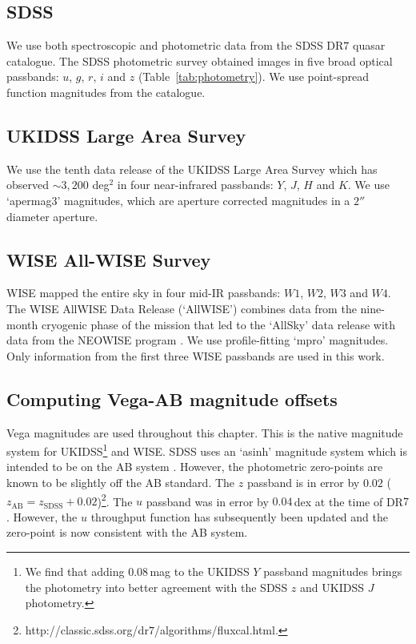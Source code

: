 \subsection{SDSS}

We use both spectroscopic and photometric data from the SDSS DR$7$ quasar catalogue.
The SDSS photometric survey obtained images in five broad optical passbands: $u$, $g$, $r$, $i$ and $z$ (Table~\ref{tab:photometry}).  
We use point-spread function magnitudes from the catalogue.

\subsection{UKIDSS Large Area Survey}

We use the tenth data release of the UKIDSS Large Area Survey which has observed $\sim 3,200$ deg$^2$ in four near-infrared passbands: $Y$, $J$, $H$ and $K$. 
We use `apermag$3$' magnitudes, which are aperture corrected magnitudes in a $2''$ diameter aperture.

\subsection{WISE All-WISE Survey}

WISE mapped the entire sky in four mid-IR passbands: $W1$, $W2$, $W3$ and $W4$. 
The WISE AllWISE Data Release (`AllWISE') combines data from the nine-month cryogenic phase of the mission that led to the `AllSky' data release with data from the NEOWISE program \citep{mainzer11}. 
We use profile-fitting `mpro' magnitudes.   
Only information from the first three WISE passbands are used in this work.

\subsection{Computing Vega-AB magnitude offsets}

Vega magnitudes are used throughout this chapter. 
This is the native magnitude system for UKIDSS\footnote{We find that adding $0.08$\,mag to the UKIDSS $Y$ passband magnitudes brings the photometry into better agreement with the SDSS $z$ and UKIDSS $J$ photometry.} and WISE.
SDSS uses an `asinh' magnitude system \citep{lupton99} which is intended to be on the AB system \citep{oke83}.
However, the photometric zero-points are known to be slightly off the AB standard. 
The $z$ passband is in error by $0.02$ ($z_{\text{AB}} = z_{\text{SDSS}} + 0.02$)\footnote{http://classic.sdss.org/dr$7$/algorithms/fluxcal.html.}.
The $u$ passband was in error by $0.04$\,dex at the time of DR$7$. 
However, the $u$ throughput function has subsequently been updated \citep{doi10} and the zero-point is now consistent with the AB system.  

